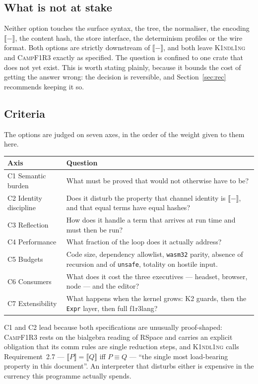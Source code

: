\documentclass[11pt,a4paper]{article}
\newcommand{\code}[1]{\texttt{#1}}
\newcommand{\Kind}{\textsc{K1ndl1ng}}
\newcommand{\Camp}{\textsc{CampF1R3}}
\newcommand{\enc}[1]{\llbracket #1 \rrbracket}
\theoremstyle{definition}
\theoremstyle{plain}
\begin{document}
\subsection{What is not at stake}

Neither option touches the surface syntax, the tree, the normaliser, the
encoding $\enc{-}$, the content hash, the store interface, the determinism
profiles or the wire format. Both options are strictly downstream of
$\enc{-}$, and both leave \Kind{} and \Camp{} exactly as specified. The
question is confined to one crate that does not yet exist. This is worth
stating plainly, because it bounds the cost of getting the answer wrong: the
decision is reversible, and Section~\ref{sec:rec} recommends keeping it so.

\subsection{Criteria}\label{sec:crit}

The options are judged on seven axes, in the order of the weight given to them
here.

\begin{center}
\begin{tabularx}{\linewidth}{@{}l>{\raggedright\arraybackslash}X@{}}
\toprule
Axis & Question\\
\midrule
C1 Semantic burden & What must be proved that would not otherwise have to be?\\
C2 Identity discipline & Does it disturb the property that channel identity is
$\enc{-}$, and that equal terms have equal hashes?\\
C3 Reflection & How does it handle a term that arrives at run time and must then
be run?\\
C4 Performance & What fraction of the loop does it actually address?\\
C5 Budgets & Code size, dependency allowlist, \code{wasm32} parity, absence of
recursion and of \code{unsafe}, totality on hostile input.\\
C6 Consumers & What does it cost the three executives --- headset, browser,
node --- and the editor?\\
C7 Extensibility & What happens when the kernel grows: K2 guards, then the
\code{Expr} layer, then full f1r3lang?\\
\bottomrule
\end{tabularx}
\end{center}

\noindent
C1 and C2 lead because both specifications are unusually proof-shaped: \Camp{}
rests on the bialgebra reading of RSpace and carries an explicit obligation that
its comm rules are single reduction steps, and \Kind{} calls
Requirement~2.7 --- $\enc{P}=\enc{Q}$ iff $P\equiv Q$ --- ``the single most
load-bearing property in this document''. An interpreter that disturbs either is
expensive in the currency this programme actually spends.
\end{document}
